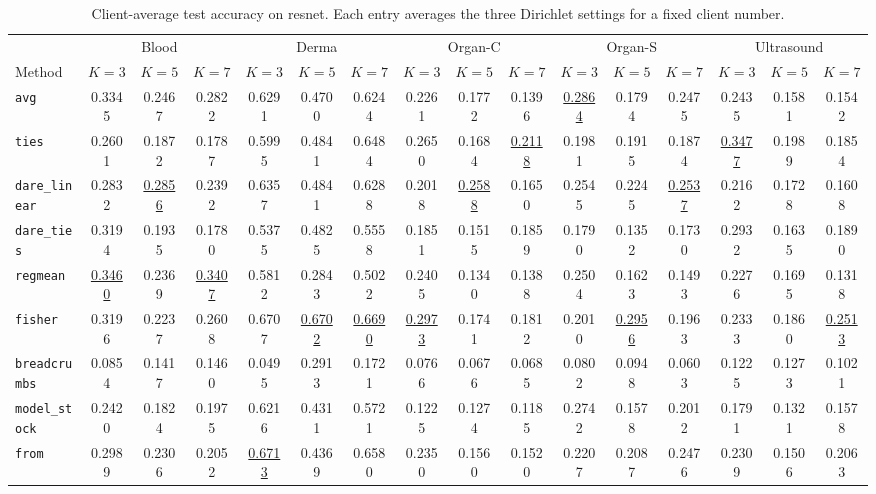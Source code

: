 \begin{table}[t]
\centering
\scriptsize
\setlength{\tabcolsep}{2.6pt}
\caption{Client-average test accuracy on resnet. Each entry averages the three Dirichlet settings for a fixed client number.}
\label{tab:client-avg-resnet}
\begin{tabular}{lccccccccccccccc}
\toprule
& \multicolumn{3}{c}{Blood} & \multicolumn{3}{c}{Derma} & \multicolumn{3}{c}{Organ-C} & \multicolumn{3}{c}{Organ-S} & \multicolumn{3}{c}{Ultrasound} \\
\cmidrule(lr){2-4}\cmidrule(lr){5-7}\cmidrule(lr){8-10}\cmidrule(lr){11-13}\cmidrule(lr){14-16}
Method & $K=3$ & $K=5$ & $K=7$ & $K=3$ & $K=5$ & $K=7$ & $K=3$ & $K=5$ & $K=7$ & $K=3$ & $K=5$ & $K=7$ & $K=3$ & $K=5$ & $K=7$ \\
\midrule
\texttt{avg} & 0.3345 & 0.2467 & 0.2822 & 0.6291 & 0.4700 & 0.6244 & 0.2261 & 0.1772 & 0.1396 & \underline{0.2864} & 0.1794 & 0.2475 & 0.2435 & 0.1581 & 0.1542 \\
\texttt{ties} & 0.2601 & 0.1872 & 0.1787 & 0.5995 & 0.4841 & 0.6484 & 0.2650 & 0.1684 & \underline{0.2118} & 0.1981 & 0.1915 & 0.1874 & \underline{0.3477} & 0.1989 & 0.1854 \\
\texttt{dare\_linear} & 0.2832 & \underline{0.2856} & 0.2392 & 0.6357 & 0.4841 & 0.6288 & 0.2018 & \underline{0.2588} & 0.1650 & 0.2545 & 0.2245 & \underline{0.2537} & 0.2162 & 0.1728 & 0.1608 \\
\texttt{dare\_ties} & 0.3194 & 0.1935 & 0.1780 & 0.5375 & 0.4825 & 0.5558 & 0.1851 & 0.1515 & 0.1859 & 0.1790 & 0.1352 & 0.1730 & 0.2932 & 0.1635 & 0.1890 \\
\texttt{regmean} & \underline{0.3460} & 0.2369 & \underline{0.3407} & 0.5812 & 0.2843 & 0.5022 & 0.2405 & 0.1340 & 0.1388 & 0.2504 & 0.1623 & 0.1493 & 0.2276 & 0.1695 & 0.1318 \\
\texttt{fisher} & 0.3196 & 0.2237 & 0.2608 & 0.6707 & \underline{0.6702} & \underline{0.6690} & \underline{0.2973} & 0.1741 & 0.1812 & 0.2010 & \underline{0.2956} & 0.1963 & 0.2333 & 0.1860 & \underline{0.2513} \\
\texttt{breadcrumbs} & 0.0854 & 0.1417 & 0.1460 & 0.0495 & 0.2913 & 0.1721 & 0.0766 & 0.0676 & 0.0685 & 0.0802 & 0.0948 & 0.0603 & 0.1225 & 0.1273 & 0.1021 \\
\texttt{model\_stock} & 0.2420 & 0.1824 & 0.1975 & 0.6216 & 0.4311 & 0.5721 & 0.1225 & 0.1274 & 0.1185 & 0.2742 & 0.1578 & 0.2012 & 0.1791 & 0.1321 & 0.1578 \\
\texttt{from} & 0.2989 & 0.2306 & 0.2052 & \underline{0.6713} & 0.4369 & 0.6580 & 0.2350 & 0.1560 & 0.1520 & 0.2207 & 0.2087 & 0.2476 & 0.2309 & 0.1506 & 0.2063 \\

\end{tabular}
\end{table}
